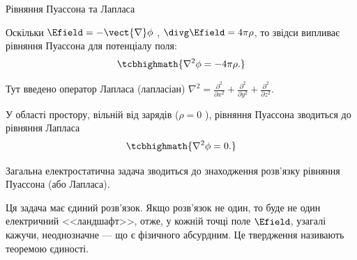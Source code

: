 \documentclass{beamer}
\begin{document}
\begin{frame}{Рівняння Пуассона та Лапласа}
	\begin{block}{}\small
		Оскільки $\Efield = - \vect{\nabla}\phi$ , $\divg\Efield  = 4\pi\rho$, то
		звідси випливає \alert{рівняння Пуассона для потенціалу поля}:
		\begin{equation*}
			\tcbhighmath{
				\nabla^2\phi = - 4\pi\rho.
			}
		\end{equation*}
	\end{block}
	\begin{block}{}\small
		Тут введено оператор Лапласа (лапласіан)
		$
			\nabla^2 = \frac{\partial^2}{\partial x^2} +
			\frac{\partial^2}{\partial y^2} + \frac{\partial^2}{\partial z^2}
		$.
	\end{block}
	\begin{block}{}
		У області простору, вільній від зарядів ($\rho = 0$ ), рівняння Пуассона
		зводиться до \alert{рівняння Лапласа}
		\begin{equation*}
			\tcbhighmath{
				\nabla^2\phi = 0 .
			}
		\end{equation*}
	\end{block}

	\begin{block}{}\justifying\small
		Загальна електростатична задача зводиться до знаходження розв'язку
		рівняння Пуассона (або Лапласа).

		\medskip

		Ця задача має \alert{єдиний розв'язок}. Якщо розв'язок не один, то буде не один електричний
		<<ландшафт>>, отже, у кожній точці поле $\Efield$, узагалі кажучи, неоднозначне --- що є
		фізичного абсурдним. Це твердження називають \alert{теоремою єдиності}.
	\end{block}
\end{frame}
\end{document}
